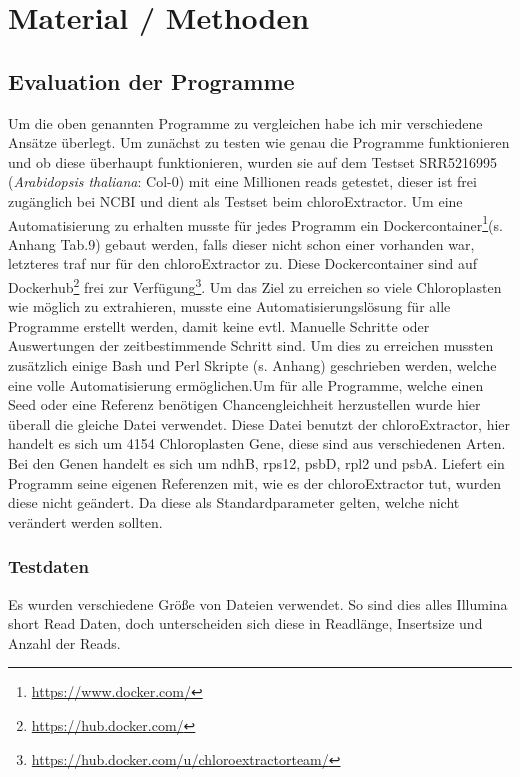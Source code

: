 \documentclass{scrartcl}
\begin{document}
\section{Material / Methoden}
\label{sec-3}
\subsection{Evaluation der Programme}
\label{sec-3-1}
Um die oben genannten Programme zu vergleichen habe ich mir verschiedene Ansätze überlegt.
Um zunächst zu testen wie genau die Programme funktionieren und ob diese überhaupt funktionieren,
wurden sie auf dem Testset SRR5216995 (\emph{Arabidopsis thaliana}: Col-0) mit eine Millionen reads getestet, 
dieser ist frei zugänglich bei NCBI und dient als Testset beim chloroExtractor\footnotemark[16]{}. Um eine 
Automatisierung zu erhalten musste für jedes Programm ein Dockercontainer\footnote{\url{https://www.docker.com/}}(s. Anhang Tab.9) gebaut werden, falls dieser nicht 
schon einer vorhanden war, letzteres traf nur für den chloroExtractor zu. Diese Dockercontainer sind auf Dockerhub\footnote{\url{https://hub.docker.com/}} frei
zur Verfügung\footnote{\url{https://hub.docker.com/u/chloroextractorteam/}}. Um das Ziel zu erreichen
so viele Chloroplasten wie möglich zu extrahieren, musste eine Automatisierungslösung für alle Programme
erstellt werden, damit keine evtl. Manuelle Schritte oder Auswertungen der zeitbestimmende Schritt sind.
Um dies zu erreichen mussten zusätzlich einige Bash und Perl Skripte (s. Anhang) geschrieben werden, welche eine volle
Automatisierung ermöglichen.Um für alle Programme, welche einen Seed oder eine Referenz benötigen Chancengleichheit herzustellen wurde hier überall die gleiche Datei verwendet. 
Diese Datei benutzt der chloroExtractor, hier handelt es sich um 4154 Chloroplasten Gene, diese sind aus verschiedenen Arten. Bei den Genen handelt es sich um ndhB, rps12, psbD, rpl2 und psbA. 
Liefert ein Programm seine eigenen Referenzen mit, wie es der chloroExtractor tut, wurden diese nicht geändert. Da diese als Standardparameter gelten, welche nicht verändert werden sollten.   

\subsubsection{Testdaten}
\label{sec-3-1-1}
Es wurden verschiedene Größe von Dateien verwendet. So sind dies alles Illumina short Read Daten, doch unterscheiden sich diese in Readlänge, Insertsize und Anzahl der Reads.
\end{document}
